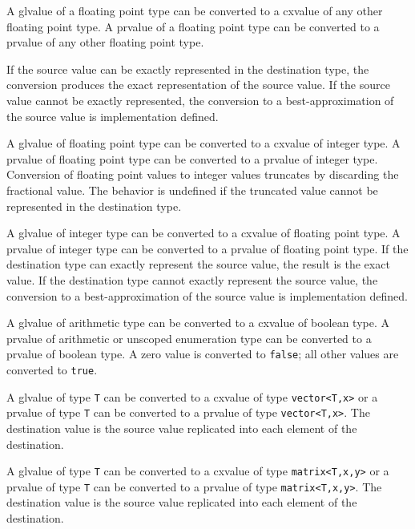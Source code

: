\p A glvalue of a floating point type can be converted to a cxvalue of any other
floating point type. A prvalue of a floating point type can be converted to a
prvalue of any other floating point type.

\p If the source value can be exactly represented in the destination type, the
conversion produces the exact representation of the source value. If the source
value cannot be exactly represented, the conversion to a best-approximation of
the source value is implementation defined.


\p A glvalue of floating point type can be converted to a cxvalue of integer
type. A prvalue of floating point type can be converted to a prvalue of
integer type. Conversion of floating point values to integer values truncates by
discarding the fractional value. The behavior is undefined if the truncated
value cannot be represented in the destination type.

\p A glvalue of integer type can be converted to a cxvalue of floating point
type. A prvalue of integer type can be converted to a prvalue of floating
point type. If the destination type can exactly represent the source value, the
result is the exact value. If the destination type cannot exactly represent the
source value, the conversion to a best-approximation of the source value is
implementation defined.


\p A glvalue of arithmetic type can be converted to a cxvalue of boolean type. A
prvalue of arithmetic or unscoped enumeration type can be converted to a prvalue
of boolean type. A zero value is converted to \texttt{false}; all other values
are converted to \texttt{true}.


\p A glvalue of type \texttt{T} can be converted to a cxvalue of type
\texttt{vector<T,x>} or a prvalue of type \texttt{T} can be converted to a
prvalue of type \texttt{vector<T,x>}. The destination value is the source value
replicated into each element of the destination.

\p A glvalue of type \texttt{T} can be converted to a cxvalue of type
\texttt{matrix<T,x,y>} or a prvalue of type \texttt{T} can be converted to a
prvalue of type \texttt{matrix<T,x,y>}. The destination value is the source
value replicated into each element of the destination.

